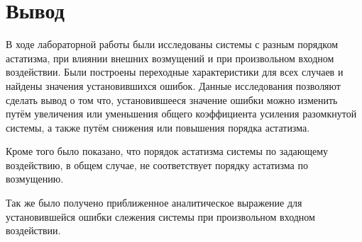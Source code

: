 \documentclass[12pt,a4paper]{article}
\begin{document}
\newpage
\section*{Вывод}
В ходе лабораторной работы были исследованы системы с разным порядком астатизма, при влиянии внешних возмущений и при произвольном входном воздействии. Были построены переходные характеристики для всех случаев и найдены значения установившихся ошибок. Данные исследования позволяют сделать вывод о том что, установившееся значение ошибки можно изменить путём увеличения или уменьшения общего коэффициента усиления разомкнутой системы, а также путём снижения или повышения порядка астатизма.\par
Кроме того было показано, что порядок астатизма системы по задающему воздействию, в общем случае, не соответствует порядку астатизма по возмущению.\par
Так же было получено приближенное аналитическое выражение для установившейся ошибки слежения системы при произвольном входном воздействии.
\end{document}
